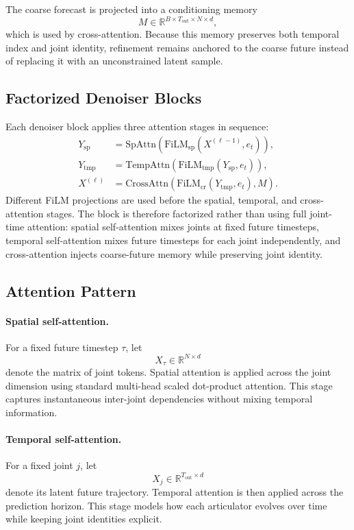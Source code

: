 \documentclass[runningheads]{llncs}
\begin{document}
The coarse forecast is projected into a conditioning memory
\[
M \in \mathbb{R}^{B \times T_{\mathrm{out}} \times N \times d},
\]
which is used by cross-attention. Because this memory preserves both temporal index and joint identity, refinement remains anchored to the coarse future instead of replacing it with an unconstrained latent sample.

\subsection{Factorized Denoiser Blocks}

Each denoiser block applies three attention stages in sequence:
\[
\begin{aligned}
Y_{\mathrm{sp}}
&=
\mathrm{SpAttn}\!\left(
\mathrm{FiLM}_{\mathrm{sp}}(X^{(\ell-1)},e_t)
\right),\\
Y_{\mathrm{tmp}}
&=
\mathrm{TempAttn}\!\left(
\mathrm{FiLM}_{\mathrm{tmp}}(Y_{\mathrm{sp}},e_t)
\right),\\
X^{(\ell)}
&=
\mathrm{CrossAttn}\!\left(
\mathrm{FiLM}_{\mathrm{cr}}(Y_{\mathrm{tmp}},e_t), M
\right).
\end{aligned}
\]
Different FiLM projections are used before the spatial, temporal, and cross-attention stages. The block is therefore factorized rather than using full joint-time attention: spatial self-attention mixes joints at fixed future timesteps, temporal self-attention mixes future timesteps for each joint independently, and cross-attention injects coarse-future memory while preserving joint identity.

\subsection{Attention Pattern}

\paragraph{Spatial self-attention.}
For a fixed future timestep $\tau$, let
\[
X_\tau \in \mathbb{R}^{N \times d}
\]
denote the matrix of joint tokens. Spatial attention is applied across the joint dimension using standard multi-head scaled dot-product attention. This stage captures instantaneous inter-joint dependencies without mixing temporal information.

\paragraph{Temporal self-attention.}
For a fixed joint $j$, let
\[
X_j \in \mathbb{R}^{T_{\mathrm{out}} \times d}
\]
denote its latent future trajectory. Temporal attention is then applied across the prediction horizon. This stage models how each articulator evolves over time while keeping joint identities explicit.
\end{document}
